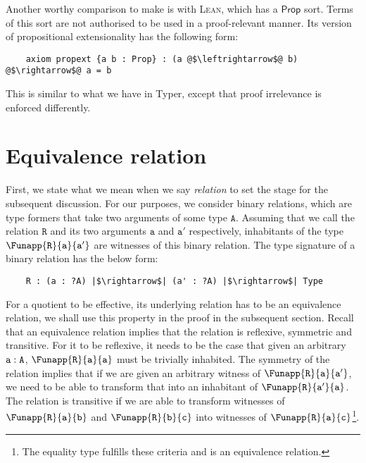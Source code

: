 \documentclass[12pt,twoside,maitrise]{dms}
\theoremstyle{definition}
\numberwithin{equation}{section}
\numberwithin{table}{chapter}
\numberwithin{figure}{chapter}
\newcommand\kw[1] {\textsf{#1}}
\newcommand\id[1] {\texttt{#1}}
\def\Lean{\textsc{Lean}\xspace}
\begin{document}
Another worthy comparison to make is with \Lean{}, which has a $\kw{Prop}$ sort.
Terms of this sort are not authorised to be used in a proof-relevant manner. Its
version of propositional extensionality has the following form:

\begin{verbatim}
    axiom propext {a b : Prop} : (a @$\leftrightarrow$@ b) @$\rightarrow$@ a = b
\end{verbatim}

This is similar to what we have in Typer, except that proof irrelevance is
enforced differently.

\section{Equivalence relation}

First, we state what we mean when we say \emph{relation} to set the stage for
the subsequent discussion. For our purposes, we consider binary relations, which
are type formers that take two arguments of some type $\id{A}$. Assuming that we
call the relation $\id{R}$ and its two arguments $\id{a}$ and $\id{a}'$
respectively, inhabitants of the type $\Funapp{\id{R}}{\id{a}}{\id{a}'}$ are
witnesses of this binary relation. The type signature of a binary relation has
the below form:

\begin{verbatim}
    R : (a : ?A) |$\rightarrow$| (a' : ?A) |$\rightarrow$| Type
\end{verbatim}

For a quotient to be effective, its underlying relation has to be an equivalence
relation, we shall use this property in the proof in the subsequent section.
Recall that an equivalence relation implies that the relation is reflexive,
symmetric and transitive. For it to be reflexive, it needs to be the case that
given an arbitrary $\oftype{\id{a}}{\id{A}}$, $\Funapp{\id{R}}{\id{a}}{\id{a}}$
must be trivially inhabited. The symmetry of the relation implies that if we are
given an arbitrary witness of $\Funapp{\id{R}}{\id{a}}{\id{a}'}$, we need to be
able to transform that into an inhabitant of $\Funapp{\id{R}}{\id{a}'}{\id{a}}$.
The relation is transitive if we are able to transform witnesses of
$\Funapp{\id{R}}{\id{a}}{\id{b}}$ and $\Funapp{\id{R}}{\id{b}}{\id{c}}$ into
witnesses of $\Funapp{\id{R}}{\id{a}}{\id{c}}$\footnote{The equality type
fulfills these criteria and is an equivalence relation.}.
\end{document}
